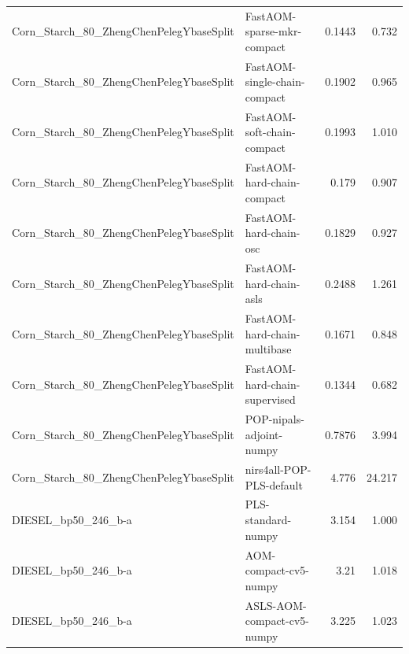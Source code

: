 \begin{landscape}
\begin{longtable}{L{8.0cm}L{9.5cm}rr}
Corn\_\allowbreak{}Starch\_\allowbreak{}80\_\allowbreak{}ZhengChenPelegYbaseSplit & FastAOM-\allowbreak{}sparse-\allowbreak{}mkr-\allowbreak{}compact & 0.1443 & 0.732 \\
Corn\_\allowbreak{}Starch\_\allowbreak{}80\_\allowbreak{}ZhengChenPelegYbaseSplit & FastAOM-\allowbreak{}single-\allowbreak{}chain-\allowbreak{}compact & 0.1902 & 0.965 \\
Corn\_\allowbreak{}Starch\_\allowbreak{}80\_\allowbreak{}ZhengChenPelegYbaseSplit & FastAOM-\allowbreak{}soft-\allowbreak{}chain-\allowbreak{}compact & 0.1993 & 1.010 \\
Corn\_\allowbreak{}Starch\_\allowbreak{}80\_\allowbreak{}ZhengChenPelegYbaseSplit & FastAOM-\allowbreak{}hard-\allowbreak{}chain-\allowbreak{}compact & 0.179 & 0.907 \\
Corn\_\allowbreak{}Starch\_\allowbreak{}80\_\allowbreak{}ZhengChenPelegYbaseSplit & FastAOM-\allowbreak{}hard-\allowbreak{}chain-\allowbreak{}osc & 0.1829 & 0.927 \\
Corn\_\allowbreak{}Starch\_\allowbreak{}80\_\allowbreak{}ZhengChenPelegYbaseSplit & FastAOM-\allowbreak{}hard-\allowbreak{}chain-\allowbreak{}asls & 0.2488 & 1.261 \\
Corn\_\allowbreak{}Starch\_\allowbreak{}80\_\allowbreak{}ZhengChenPelegYbaseSplit & FastAOM-\allowbreak{}hard-\allowbreak{}chain-\allowbreak{}multibase & 0.1671 & 0.848 \\
Corn\_\allowbreak{}Starch\_\allowbreak{}80\_\allowbreak{}ZhengChenPelegYbaseSplit & FastAOM-\allowbreak{}hard-\allowbreak{}chain-\allowbreak{}supervised & 0.1344 & 0.682 \\
Corn\_\allowbreak{}Starch\_\allowbreak{}80\_\allowbreak{}ZhengChenPelegYbaseSplit & POP-\allowbreak{}nipals-\allowbreak{}adjoint-\allowbreak{}numpy & 0.7876 & 3.994 \\
Corn\_\allowbreak{}Starch\_\allowbreak{}80\_\allowbreak{}ZhengChenPelegYbaseSplit & nirs4all-\allowbreak{}POP-\allowbreak{}PLS-\allowbreak{}default & 4.776 & 24.217 \\
DIESEL\_\allowbreak{}bp50\_\allowbreak{}246\_\allowbreak{}b-\allowbreak{}a & PLS-\allowbreak{}standard-\allowbreak{}numpy & 3.154 & 1.000 \\
DIESEL\_\allowbreak{}bp50\_\allowbreak{}246\_\allowbreak{}b-\allowbreak{}a & AOM-\allowbreak{}compact-\allowbreak{}cv5-\allowbreak{}numpy & 3.21 & 1.018 \\
DIESEL\_\allowbreak{}bp50\_\allowbreak{}246\_\allowbreak{}b-\allowbreak{}a & ASLS-\allowbreak{}AOM-\allowbreak{}compact-\allowbreak{}cv5-\allowbreak{}numpy & 3.225 & 1.023 \\

\end{longtable}
\end{landscape}
